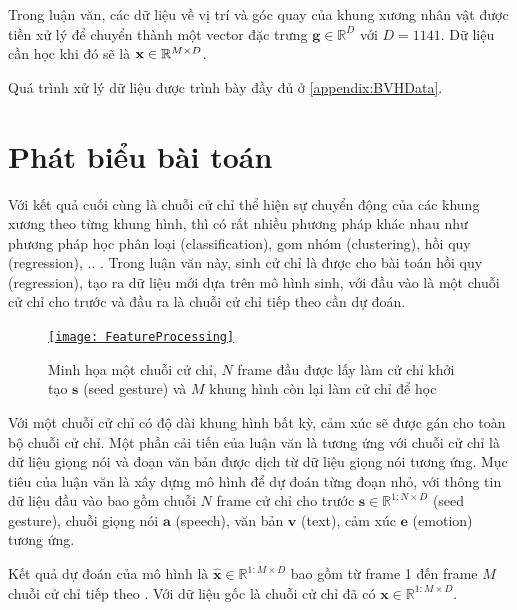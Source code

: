 Trong luận văn, các dữ liệu về vị trí và góc quay của khung xương nhân vật được tiền xử lý để chuyển thành một vector đặc trưng $\mathbf{g} \in \mathbb{R}^{D}$ với $D=1141$. Dữ liệu cần học khi đó sẽ là $\mathbf{x} \in \mathbb{R}^{M \times D}$.

Quá trình xử lý dữ liệu được trình bày đầy đủ ở \autoref{appendix:BVHData}.

\section{Phát biểu bài toán}
\label{sec:ProblemStatement}

Với kết quả cuối cùng là chuỗi cử chỉ thể hiện sự chuyển động của các khung xương theo từng khung hình, thì có rất nhiều phương pháp khác nhau như phương pháp học phân loại (classification), gom nhóm (clustering), hồi quy (regression), .. . Trong luận văn này, sinh cử chỉ là  được cho bài toán hồi quy (regression), tạo ra dữ liệu mới dựa trên mô hình sinh, với đầu vào là một chuỗi cử chỉ cho trước và đầu ra là chuỗi cử chỉ tiếp theo cần dự đoán.
	
\begin{figure}[H]
	\centering
	\href{https://www.youtube.com/watch?v=B6nv1kQmi-Q}{\texttt{[image: FeatureProcessing]}}
	\caption{Minh họa một chuỗi cử chỉ, $N$ frame đầu được lấy làm cử chỉ khởi tạo $\mathbf{s}$ (seed gesture) và $M$ khung hình còn lại làm cử chỉ để học}
	\label{fig:GestureSeries}
\end{figure}

Với một chuỗi cử chỉ có độ dài khung hình bất kỳ, cảm xúc sẽ được gán cho toàn bộ chuỗi cử chỉ. Một phần cải tiến của luận văn là tương ứng với chuỗi cử chỉ là dữ liệu giọng nói và đoạn văn bản được dịch từ dữ liệu giọng nói tương ứng.
Mục tiêu của luận văn là xây dựng mô hình để dự đoán từng đoạn nhỏ, với thông tin dữ liệu đầu vào bao gồm chuỗi $N$ frame cử chỉ cho trước $\mathbf{s} \in \mathbb{R}^{1:N \times D}$ (seed gesture), chuỗi giọng nói $\mathbf{a}$ (speech), văn bản $\mathbf{v}$ (text),  cảm xúc $\mathbf{e}$ (emotion) tương ứng.

Kết quả dự đoán của mô hình là $\hat{\mathbf{x}} \in \mathbb{R}^{1:M \times D}$ bao gồm từ frame 1 đến frame $M$ chuỗi cử chỉ tiếp theo . Với dữ liệu gốc là chuỗi cử chỉ đã có $\mathbf{x}  \in \mathbb{R}^{1:M \times D}$.

